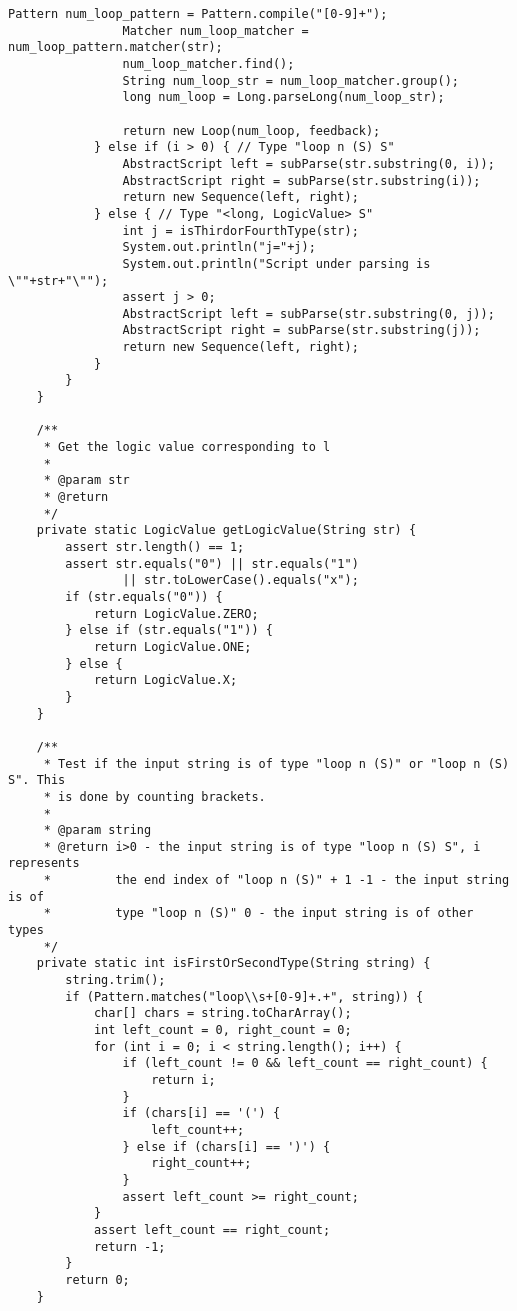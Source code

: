 \begin{lstlisting}[caption=ElementDictionary, label=listing7]
				Pattern num_loop_pattern = Pattern.compile("[0-9]+");
				Matcher num_loop_matcher = num_loop_pattern.matcher(str);
				num_loop_matcher.find();
				String num_loop_str = num_loop_matcher.group();
				long num_loop = Long.parseLong(num_loop_str);

				return new Loop(num_loop, feedback);
			} else if (i > 0) { // Type "loop n (S) S"
				AbstractScript left = subParse(str.substring(0, i));
				AbstractScript right = subParse(str.substring(i));
				return new Sequence(left, right);
			} else { // Type "<long, LogicValue> S"
				int j = isThirdorFourthType(str);
				System.out.println("j="+j);
				System.out.println("Script under parsing is \""+str+"\"");
				assert j > 0;
				AbstractScript left = subParse(str.substring(0, j));
				AbstractScript right = subParse(str.substring(j));
				return new Sequence(left, right);
			}
		}
	}

	/**
	 * Get the logic value corresponding to l
	 * 
	 * @param str
	 * @return
	 */
	private static LogicValue getLogicValue(String str) {
		assert str.length() == 1;
		assert str.equals("0") || str.equals("1")
				|| str.toLowerCase().equals("x");
		if (str.equals("0")) {
			return LogicValue.ZERO;
		} else if (str.equals("1")) {
			return LogicValue.ONE;
		} else {
			return LogicValue.X;
		}
	}

	/**
	 * Test if the input string is of type "loop n (S)" or "loop n (S) S". This
	 * is done by counting brackets.
	 * 
	 * @param string
	 * @return i>0 - the input string is of type "loop n (S) S", i represents
	 *         the end index of "loop n (S)" + 1 -1 - the input string is of
	 *         type "loop n (S)" 0 - the input string is of other types
	 */
	private static int isFirstOrSecondType(String string) {
		string.trim();
		if (Pattern.matches("loop\\s+[0-9]+.+", string)) {
			char[] chars = string.toCharArray();
			int left_count = 0, right_count = 0;
			for (int i = 0; i < string.length(); i++) {
				if (left_count != 0 && left_count == right_count) {
					return i;
				}
				if (chars[i] == '(') {
					left_count++;
				} else if (chars[i] == ')') {
					right_count++;
				}
				assert left_count >= right_count;
			}
			assert left_count == right_count;
			return -1;
		}
		return 0;
	}


\end{lstlisting}
